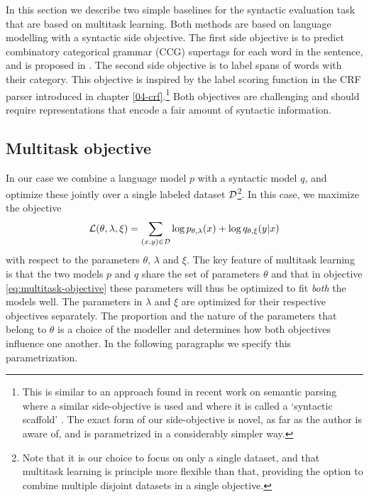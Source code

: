   In this section we describe two simple baselines for the syntactic evaluation task that are based on multitask learning. Both methods are based on language modelling with a syntactic side objective. The first side objective is to predict combinatory categorical grammar (CCG) supertags \citep{bangalore1999supertagging} for each word in the sentence, and is proposed in \citep{enguehard2017multitask}. The second side objective is to label spans of words with their category. This objective is inspired by the label scoring function in the CRF parser introduced in chapter \ref{04-crf}.\footnote{This is similar to an approach found in recent work on semantic parsing where a similar side-objective is used and where it is called a `syntactic scaffold' \citep{swayamdipta2018scaffold}. The exact form of our side-objective is novel, as far as the author is aware of, and is parametrized in a considerably simpler way.} Both objectives are challenging and should require representations that encode a fair amount of syntactic information.

  \subsection{Multitask objective}
    In our case we combine a language model $p$ with a syntactic model $q$, and optimize these jointly over a single labeled dataset $\mathcal{D}$\footnote{Note that it is our choice to focus on only a single dataset, and that multitask learning is principle more flexible than that, providing the option to combine multiple disjoint datasets in a single objective.}. In this case, we maximize the objective
    \begin{equation}
      \label{eq:multitask-objective}
      \mathcal{L}(\theta, \lambda, \xi) = \sum_{ (x, y) \in \mathcal{D} }\log p_{\theta, \lambda}(x) + \log q_{\theta,\xi}(y | x)
    \end{equation}
    with respect to the parameters $\theta$, $\lambda$ and $\xi$. The key feature of multitask learning is that the two models $p$ and $q$ share the set of parameters $\theta$ and that in objective \ref{eq:multitask-objective} these parameters will thus be optimized to fit \textit{both} the models well. The parameters in $\lambda$ and $\xi$ are optimized for their respective objectives separately. The proportion and the nature of the parameters that belong to $\theta$ is a choice of the modeller and determines how both objectives influence one another. In the following paragraphs we specify this parametrization.

